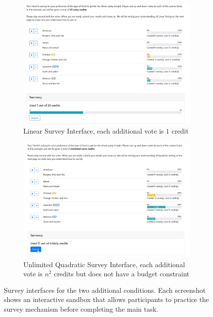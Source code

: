 \begin{figure}
    \centering
    \begin{subfigure}{0.75\textwidth}
        \centering
        \includegraphics[width=\textwidth]{content/image/linear.png}
        \caption{Linear Survey Interface, each additional vote is $1$ credit}
        \label{fig:qs_interface}
    \end{subfigure}
    
    \vspace*{1cm}

    \begin{subfigure}{0.75\textwidth}
        \centering
        \includegraphics[width=\textwidth]{content/image/uqs.png}
        \caption{Unlimited Quadratic Survey Interface, each additional vote is $n^2$ credits but does not have a budget constraint}
        \label{fig:css_interface}
    \end{subfigure}
    
    \caption{Survey interfaces for the two additional conditions. Each screenshot shows an interactive sandbox that allows  participants to practice the survey mechanism before completing the main task.}
    \label{fig:extended_interface}
\end{figure}




